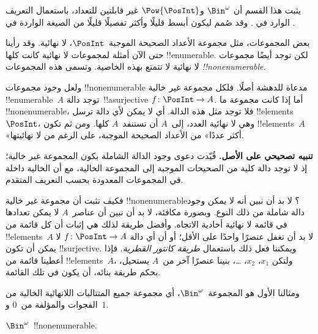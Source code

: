 \documentclass[../../../include/open-logic-section]{subfiles}
\begin{document}


\begin{editorial}
  يثبت هذا القسم أن $\Bin^\omega$ و$\Pow{\PosInt}$ غير قابلتين
  للتعداد، باستعمال التعريف الوارد في . وقد صُمم
  ليكون أبسط قليلًا وأكثر تفصيلًا قليلًا من الصيغة الواردة في
  .
\end{editorial}

بعض المجموعات، مثل مجموعة الأعداد الصحيحة الموجبة~$\PosInt$، لا
نهائية. وقد رأينا حتى الآن أمثلة لمجموعات لا نهائية كانت كلها
!!{enumerable}. لكن توجد أيضًا مجموعات لا نهائية لا تتمتع بهذه
الخاصية. وتسمى هذه المجموعات \emph{!!{nonenumerable}}.

ولعل وجود مجموعات !!{nonenumerable} مدعاة للدهشة أصلًا. فلكل مجموعة غير خالية
!!{enumerable}~$A$ توجد دالة~!!a{surjective}
$f \colon \PosInt \to A$. أما إذا كانت مجموعة ما !!{nonenumerable}،
فلا توجد مثل هذه الدالة. أي لا يمكن لأي دالة ترسل !!{element}s~$\PosInt$،
وهي لا نهائية العدد، إلى~$A$ أن تستنفد~$A$ كلها. ومن ثم تكون
!!{element}s~$A$ «أكثر عددًا» من الأعداد الصحيحة الموجبة، على الرغم
من لا نهائيتها.

\textbf{تنبيه تصحيحي على الأصل.} قُيّدت دعوى وجود الدالة الشاملة بكون
المجموعة غير خالية؛ إذ لا توجد دالة كلية من الصحيحات الموجبة إلى المجموعة الخالية،
مع أن الخالية داخلة في المجموعات المعدودة بحسب التعريف المتقدم.

فكيف نثبت أن مجموعة غير خالية !!{nonenumerable}؟ لا بد أن نبين أنه لا يمكن
وجود دالة شاملة من ذلك النوع. وبصورة مكافئة، لا بد أن نبين أن عناصر~$A$
لا يمكن تعدادها في قائمة لا نهائية أحادية الاتجاه. وأفضل طريقة لذلك
هي إثبات أن كل قائمة من !!{element}s~$A$ لا بد أن تغفل عنصرًا واحدًا
على الأقل؛ أو أن أي دالة $f\colon \PosInt \to A$ لا يمكن أن تكون
!!{surjective}. ويمكننا فعل ذلك باستعمال \emph{طريقة كانتور القطرية}.
فإذا أعطينا قائمة من !!{element}s~$A$، ولتكن $x_1$، $x_2$، \dots،
بنينا عنصرًا آخر من~$A$ يستحيل، بحكم طريقة بنائه، أن يكون في تلك
القائمة.

ومثالنا الأول هو المجموعة~$\Bin^\omega$، أي مجموعة جميع المتتاليات
اللانهائية الخالية من الفجوات والمؤلفة من~$0$ و~$1$.

\begin{thm}
$\Bin^\omega$~!!{nonenumerable}.
\end{thm}
\end{document}
